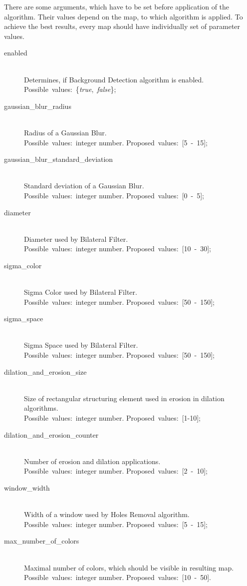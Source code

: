 \documentclass[a4paper,onecolumn,oneside,12pt]{memoir}
\begin{document}
There are some arguments, which have to be set before application of the algorithm. Their values
depend on the map, to which algorithm is applied. To achieve the best results, every map should have
individually set of parameter values.

\begin{description}
  \item[enabled] \hfill \\
    Determines, if Background Detection algorithm is enabled. \\
    Possible~values:~\{\textit{true},~\textit{false}\};
  \item[gaussian\_blur\_radius] \hfill \\
    Radius of a Gaussian Blur. \\
    Possible~values:~integer number. Proposed~values:~[5~-~15];
  \item[gaussian\_blur\_standard\_deviation] \hfill \\
    Standard deviation of a Gaussian Blur. \\
    Possible~values:~integer number. Proposed~values:~[0~-~5];
  \item[diameter] \hfill \\
    Diameter used by Bilateral Filter. \\
    Possible~values:~integer number. Proposed~values:~[10~-~30];
  \item[sigma\_color] \hfill \\
    Sigma Color used by Bilateral Filter. \\
    Possible~values:~integer number. Proposed~values:~[50~-~150];
  \item[sigma\_space] \hfill \\
    Sigma Space used by Bilateral Filter. \\
    Possible~values:~integer number. Proposed~values:~[50~-~150];
  \item[dilation\_and\_erosion\_size] \hfill \\
    Size of rectangular structuring element used in erosion in dilation algorithms. \\
    Possible~values:~integer number. Proposed~values:~[1-10];
  \item[dilation\_and\_erosion\_counter] \hfill \\
    Number of erosion and dilation applications. \\
    Possible~values:~integer number. Proposed~values:~[2~-~10];
  \item[window\_width] \hfill \\
    Width of a window used by Holes Removal algorithm. \\
    Possible~values:~integer number. Proposed~values:~[5~-~15];
  \item[max\_number\_of\_colors] \hfill \\
    Maximal number of colors, which should be visible in resulting map. \\
    Possible~values:~integer number. Proposed~values:~[10~-~50].
\end{description}
\end{document}
